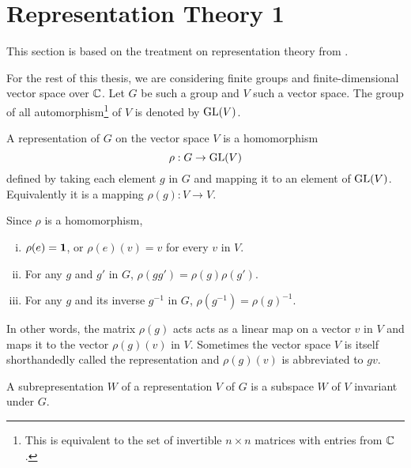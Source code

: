 \clearpage{\thispagestyle{empty}}
\section{Representation Theory 1}

This section is based on the treatment on representation theory from \cite{FultonHarris}.

For the rest of this thesis, we are considering finite groups and finite-dimensional vector space over $\mathbb{C}$. Let $G$ be such a group and $V$ such a vector space. The group of all automorphism\footnote{This is equivalent to the set of invertible $n \times n$ matrices with entries from $\mathbb{C}$.} of $V$ is denoted by $\text{GL}(V)$.

\begin{definition}[Representation]
	A representation of $G$ on the vector space $V$ is a homomorphism
	\[
	\rho: G \rightarrow \text{GL}(V) 
	\]
	defined by taking each element $g$ in $G$ and mapping it to an element of $\text{GL}(V)$. Equivalently it is a mapping $\rho(g): V \rightarrow V$. 
\end{definition}
\begin{remark}
	Since $\rho$ is a homomorphism, 
	\begin{enumerate}[i)]
		\item $\rho(e) = \mathbf{1}$, or $\rho(e)(v)=v$ for every $v$ in $V$.
		\item For any $g$ and $g'$ in $G$, $\rho(gg') = \rho(g)\rho(g')$.
		\item For any $g$ and its inverse $g^{-1}$ in $G$, $\rho(g^{-1}) = \rho(g)^{-1}$.
	\end{enumerate}
\end{remark}

In other words, the matrix $\rho(g)$ acts acts as a linear map on a vector $v$ in $V$ and maps it to the vector $\rho(g)(v)$ in $V$. Sometimes the vector space $V$ is itself shorthandedly called the representation and $\rho(g)(v)$ is abbreviated to $gv$.


\begin{definition}[Subrepresentation]
	A subrepresentation $W$ of a representation $V$ of $G$ is a subspace $W$ of $V$ invariant under $G$.
\end{definition}

